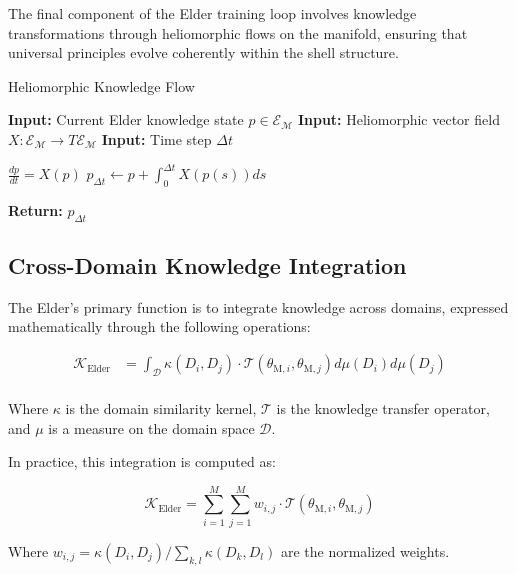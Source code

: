 The final component of the Elder training loop involves knowledge transformations through heliomorphic flows on the manifold, ensuring that universal principles evolve coherently within the shell structure.

\begin{algorithm}
\caption{Heliomorphic Knowledge Flow}
\begin{algorithmic}[1]
\State \textbf{Input:} Current Elder knowledge state $p \in \mathcal{E}_{\mathcal{M}}$
\State \textbf{Input:} Heliomorphic vector field $X: \mathcal{E}_{\mathcal{M}} \rightarrow T\mathcal{E}_{\mathcal{M}}$
\State \textbf{Input:} Time step $\Delta t$

\State $\frac{dp}{dt} = X(p)$ 
\State $p_{\Delta t} \gets p + \int_0^{\Delta t} X(p(s)) ds$ 

\State \textbf{Return:} $p_{\Delta t}$
\end{algorithmic}
\end{algorithm}

\subsection{Cross-Domain Knowledge Integration}

The Elder's primary function is to integrate knowledge across domains, expressed mathematically through the following operations:

\begin{equation}
\begin{aligned}
\mathcal{K}_{\text{Elder}} &= \int_{\mathcal{D}} \kappa(D_i, D_j) \cdot \mathcal{T}(\theta_{\text{M},i}, \theta_{\text{M},j}) d\mu(D_i) d\mu(D_j) \\
\end{aligned}
\end{equation}

Where $\kappa$ is the domain similarity kernel, $\mathcal{T}$ is the knowledge transfer operator, and $\mu$ is a measure on the domain space $\mathcal{D}$.

In practice, this integration is computed as:

\begin{equation}
\mathcal{K}_{\text{Elder}} = \sum_{i=1}^M \sum_{j=1}^M w_{i,j} \cdot \mathcal{T}(\theta_{\text{M},i}, \theta_{\text{M},j})
\end{equation}

Where $w_{i,j} = \kappa(D_i, D_j) / \sum_{k,l} \kappa(D_k, D_l)$ are the normalized weights.

